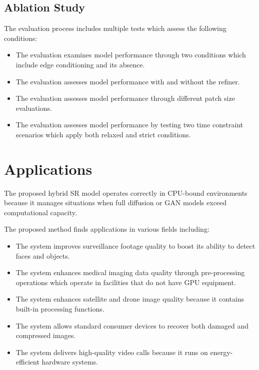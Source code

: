 \documentclass[conference]{IEEEtran}
\begin{document}
\subsection{Ablation Study}
The evaluation process includes multiple tests which assess the following conditions:

\begin{itemize}
    \item The evaluation examines model performance through two conditions which include edge conditioning and its absence.
    \item The evaluation assesses model performance with and without the refiner.
    \item The evaluation assesses model performance through different patch size evaluations.
    \item The evaluation assesses model performance by testing two time constraint scenarios which apply both relaxed and strict conditions.
\end{itemize}

\section{Applications}
The proposed hybrid SR model operates correctly in CPU-bound environments because it manages situations when full diffusion or GAN models exceed computational capacity.

The proposed method finds applications in various fields including:

\begin{itemize}
    \item The system improves surveillance footage quality to boost its ability to detect faces and objects.
    \item The system enhances medical imaging data quality through pre-processing operations which operate in facilities that do not have GPU equipment.
    \item The system enhances satellite and drone image quality because it contains built-in processing functions.
    \item The system allows standard consumer devices to recover both damaged and compressed images.
    \item The system delivers high-quality video calls because it runs on energy-efficient hardware systems.
\end{itemize}
\end{document}
